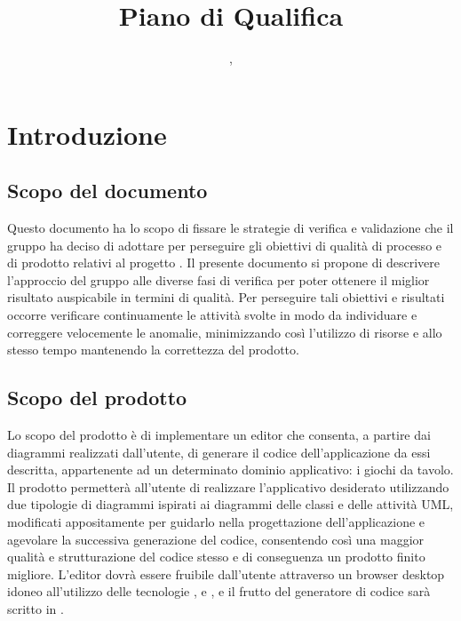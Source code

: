

\usepackage{hyperref}
\hypersetup{hidelinks}

\author{\LS, \AZ}
\title{Piano di Qualifica}

\renewcommand{\arraystretch}{1.5}
\setcounter{tocdepth}{4}
\setcounter{secnumdepth}{4}


\maketitle

\tableofcontents
\newpage

\section{Introduzione}
	\subsection{Scopo del documento}
	Questo documento ha lo scopo di fissare le strategie di verifica e validazione che il gruppo {\hx} ha deciso di adottare per perseguire gli obiettivi di qualità di processo e di prodotto relativi al progetto {\proj}. Il presente documento si propone di descrivere l'approccio del gruppo alle diverse fasi di verifica per poter ottenere il miglior risultato auspicabile in termini di qualità. Per perseguire tali obiettivi e risultati occorre verificare continuamente le attività svolte in modo da individuare e correggere velocemente le anomalie, minimizzando così l'utilizzo di risorse e allo stesso tempo mantenendo la correttezza del prodotto.

	\subsection{Scopo del prodotto}
	Lo scopo del prodotto è di implementare un editor  che consenta, a partire dai diagrammi realizzati dall’utente, di generare il codice dell'applicazione da essi descritta, appartenente ad un determinato dominio applicativo: i giochi da tavolo. 
Il prodotto permetterà all’utente di realizzare l’applicativo desiderato utilizzando due tipologie di diagrammi ispirati ai diagrammi delle classi e delle attività UML, modificati appositamente per guidarlo nella progettazione dell'applicazione e agevolare la successiva generazione del codice, consentendo così una maggior qualità e strutturazione del codice stesso e di conseguenza un prodotto finito migliore.
L'editor dovrà essere fruibile dall'utente attraverso un browser desktop idoneo all'utilizzo delle tecnologie ,  e , e il frutto del generatore di codice sarà scritto in .


